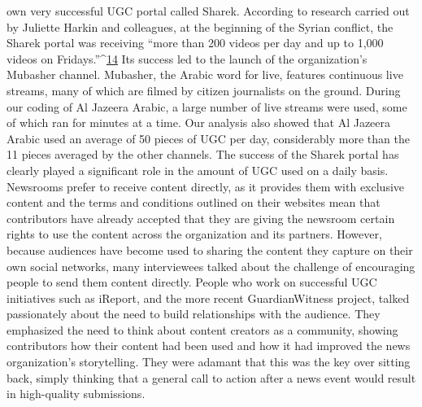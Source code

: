 \begin{enumerate}
own very successful UGC portal called Sharek. According to research carried
out by Juliette Harkin and colleagues, at the beginning of the Syrian
conflict, the Sharek portal was receiving ``more than 200 videos per day and
up to 1,000 videos on Fridays.''^{\href{#endnotes}{14}} Its success led to the launch of the organization's
Mubasher channel. Mubasher, the Arabic word for live, features
continuous live streams, many of which are filmed by citizen journalists on
the ground. During our coding of Al Jazeera Arabic, a large number of live
streams were used, some of which ran for minutes at a time. Our analysis
also showed that Al Jazeera Arabic used an average of 50 pieces of UGC per
day, considerably more than the 11 pieces averaged by the other channels.
The success of the Sharek portal has clearly played a significant role in the
amount of UGC used on a daily basis.
Newsrooms prefer to receive content directly, as it provides them with
exclusive content and the terms and conditions outlined on their websites
mean that contributors have already accepted that they are giving the newsroom
certain rights to use the content across the organization and its partners.
However, because audiences have become used to sharing the content
they capture on their own social networks, many interviewees talked about
the challenge of encouraging people to send them content directly. People
who work on successful UGC initiatives such as iReport, and the more
recent GuardianWitness project, talked passionately about the need to
build relationships with the audience. They emphasized the need to think
about content creators as a community, showing contributors how their
content had been used and how it had improved the news organization's
storytelling. They were adamant that this was the key over sitting back, simply
thinking that a general call to action after a news event would result in
high-quality submissions.


\end{enumerate}
